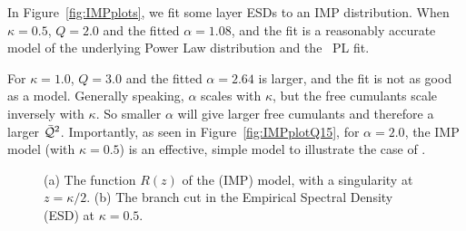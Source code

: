 In Figure~\ref{fig:IMPplots}, we fit some \Typical layer ESDs to an IMP distribution.
When $\kappa=0.5$, $Q=2.0$ and the fitted $\alpha=1.08$, and the fit is a reasonably accurate model of the underlying Power Law
distribution and the ~\WW PL fit.

For  $\kappa=1.0$, $Q=3.0$ and the fitted $\alpha=2.64$ is larger, and the fit is not as good as a
model. Generally speaking, $\alpha$ scales with $\kappa$, but the  free cumulants scale inversely with $\kappa$.
So smaller $\alpha$ will give larger free cumulants and therefore a larger $\bar{\mathcal{Q}}^{2}$.
Importantly, as seen in Figure~\ref{fig:IMPplotQ15}, for $\alpha= 2.0$, the IMP model (with $\kappa=0.5$)
is an effective, simple model to illustrate the \SETOL case of \IdealLearning.

\begin{figure}[t]
    \centering
    \caption{(a) The function $R(z)$ of the \InverseMP (IMP) model, with a singularity at $z = \kappa/2$. (b) The branch cut in the Empirical Spectral Density (ESD) at $\kappa = 0.5$.}
    \label{fig:R_branch_cut_combined}
\end{figure}

